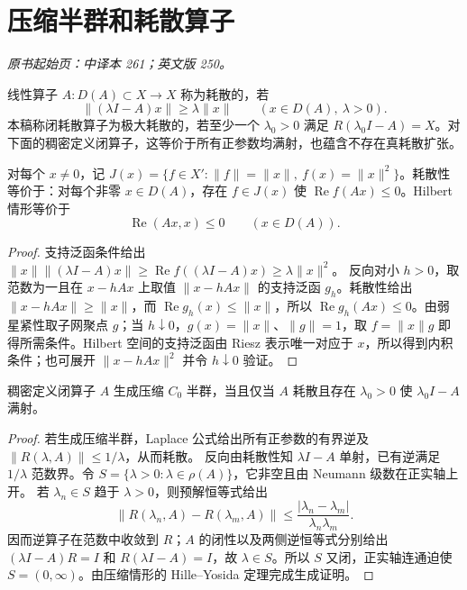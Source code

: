 \section{压缩半群和耗散算子}\label{sec:yosida-09-08}
\noindent\textit{原书起始页：中译本 261；英文版 250。}

\begin{definition}[耗散与极大耗散]
线性算子 $A:D(A)\subset X\to X$ 称为耗散的，若
\begin{equation}\label{eq:y9-dissipative}
 \|(\lambda I-A)x\|\ge\lambda\|x\|\qquad(x\in D(A),\ \lambda>0).
\end{equation}
本稿称闭耗散算子为极大耗散的，若至少一个 $\lambda_0>0$ 满足 $R(\lambda_0I-A)=X$。对下面的稠密定义闭算子，这等价于所有正参数均满射，也蕴含不存在真耗散扩张。
\end{definition}

\begin{proposition}
对每个 $x\ne0$，记 $J(x)=\{f\in X':\|f\|=\|x\|,\ f(x)=\|x\|^2\}$。耗散性等价于：对每个非零 $x\in D(A)$，存在 $f\in J(x)$ 使 $\operatorname{Re}f(Ax)\le0$。Hilbert 情形等价于
\begin{equation}\label{eq:y9-hilbert-dissipative}
 \operatorname{Re}(Ax,x)\le0\qquad(x\in D(A)).
\end{equation}
\end{proposition}
\begin{proof}
支持泛函条件给出
$\|x\|\|(\lambda I-A)x\|\ge\operatorname{Re}f((\lambda I-A)x)\ge\lambda\|x\|^2$。
反向对小 $h>0$，取范数为一且在 $x-hAx$ 上取值 $\|x-hAx\|$ 的支持泛函 $g_h$。耗散性给出 $\|x-hAx\|\ge\|x\|$，而 $\operatorname{Re}g_h(x)\le\|x\|$，所以 $\operatorname{Re}g_h(Ax)\le0$。由弱星紧性取子网聚点 $g$；当 $h\downarrow0$，$g(x)=\|x\|$、$\|g\|=1$，取 $f=\|x\|g$ 即得所需条件。Hilbert 空间的支持泛函由 Riesz 表示唯一对应于 $x$，所以得到内积条件；也可展开 $\|x-hAx\|^2$ 并令 $h\downarrow0$ 验证。
\end{proof}

\begin{theorem}\label{thm:y9-lumer-phillips}
稠密定义闭算子 $A$ 生成压缩 $C_0$ 半群，当且仅当 $A$ 耗散且存在 $\lambda_0>0$ 使 $\lambda_0I-A$ 满射。
\end{theorem}
\begin{proof}
若生成压缩半群，Laplace 公式给出所有正参数的有界逆及 $\|R(\lambda,A)\|\le1/\lambda$，从而耗散。
反向由耗散性知 $\lambda I-A$ 单射，已有逆满足 $1/\lambda$ 范数界。令 $S=\{\lambda>0:\lambda\in\rho(A)\}$，它非空且由 Neumann 级数在正实轴上开。
若 $\lambda_n\in S$ 趋于 $\lambda>0$，则预解恒等式给出
\[
 \|R(\lambda_n,A)-R(\lambda_m,A)\|
 \le\frac{|\lambda_n-\lambda_m|}{\lambda_n\lambda_m}.
\]
因而逆算子在范数中收敛到 $R$；$A$ 的闭性以及两侧逆恒等式分别给出 $(\lambda I-A)R=I$ 和 $R(\lambda I-A)=I$，故 $\lambda\in S$。所以 $S$ 又闭，正实轴连通迫使 $S=(0,\infty)$。由压缩情形的 Hille--Yosida 定理完成生成证明。
\end{proof}


